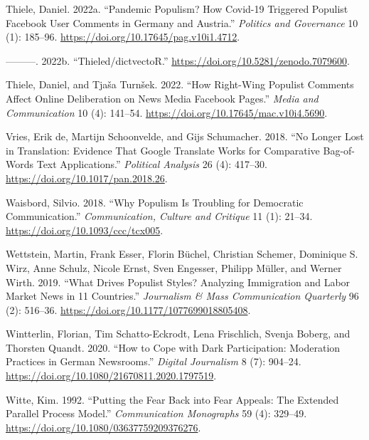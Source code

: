 \documentclass[
]{ccr}
\newlength{\cslhangindent}
\newlength{\cslentryspacingunit} %
\newenvironment{CSLReferences}[2] %
 {%
  \setlength{\parindent}{0pt}
  \ifodd #1
  \let\oldpar\par
  \def\par{\hangindent=\cslhangindent\oldpar}
  \fi
  \setlength{\parskip}{#2\cslentryspacingunit}
 }%
 {}
\begin{document}
\begin{CSLReferences}{1}{0}
\leavevmode{}%
Thiele, Daniel. 2022a. {``Pandemic Populism? {How Covid-19} Triggered
Populist {Facebook} User Comments in {Germany} and {Austria}.''}
\emph{Politics and Governance} 10 (1): 185--96.
\url{https://doi.org/10.17645/pag.v10i1.4712}.

\leavevmode{}%
---------. 2022b. {``Thieled/{dictvectoR}.''}
\url{https://doi.org/10.5281/zenodo.7079600}.

\leavevmode{}%
Thiele, Daniel, and Tjaša Turnšek. 2022. {``How {Right-Wing Populist
Comments Affect Online Deliberation} on {News Media Facebook Pages}.''}
\emph{Media and Communication} 10 (4): 141--54.
\url{https://doi.org/10.17645/mac.v10i4.5690}.

\leavevmode{}%
Vries, Erik de, Martijn Schoonvelde, and Gijs Schumacher. 2018. {``No
{Longer Lost} in {Translation}: {Evidence} That {Google Translate Works}
for {Comparative Bag-of-Words Text Applications}.''} \emph{Political
Analysis} 26 (4): 417--30. \url{https://doi.org/10.1017/pan.2018.26}.

\leavevmode{}%
Waisbord, Silvio. 2018. {``Why Populism Is Troubling for Democratic
Communication.''} \emph{Communication, Culture and Critique} 11 (1):
21--34. \url{https://doi.org/10.1093/ccc/tcx005}.

\leavevmode{}%
Wettstein, Martin, Frank Esser, Florin Büchel, Christian Schemer,
Dominique S. Wirz, Anne Schulz, Nicole Ernst, Sven Engesser, Philipp
Müller, and Werner Wirth. 2019. {``What {Drives Populist Styles}?
{Analyzing Immigration} and {Labor Market News} in 11 {Countries}.''}
\emph{Journalism \& Mass Communication Quarterly} 96 (2): 516--36.
\url{https://doi.org/10.1177/1077699018805408}.

\leavevmode{}%
Wintterlin, Florian, Tim Schatto-Eckrodt, Lena Frischlich, Svenja
Boberg, and Thorsten Quandt. 2020. {``How to {Cope} with {Dark
Participation}: {Moderation Practices} in {German Newsrooms}.''}
\emph{Digital Journalism} 8 (7): 904--24.
\url{https://doi.org/10.1080/21670811.2020.1797519}.

\leavevmode{}%
Witte, Kim. 1992. {``Putting the Fear Back into Fear Appeals: {The}
Extended Parallel Process Model.''} \emph{Communication Monographs} 59
(4): 329--49. \url{https://doi.org/10.1080/03637759209376276}.


\end{CSLReferences}
\end{document}
